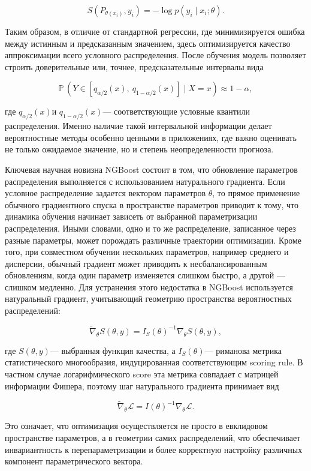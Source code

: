 \documentclass[
]{article}
\begin{document}
\[S(P_{\theta(x_{i})},y_{i}) = - \log p(y_{i} \mid x_{i};\theta).
\]

Таким образом, в отличие от стандартной регрессии, где минимизируется ошибка между истинным и предсказанным значением, здесь оптимизируется качество аппроксимации всего условного распределения. После обучения модель позволяет строить доверительные или, точнее, предсказательные интервалы вида

\[\mathbb{P}\text{ ⁣}\left( Y \in \left\lbrack q_{\alpha/2}(x),\text{ }q_{1 - \alpha/2}(x) \right\rbrack \mid X = x \right) \approx 1 - \alpha,
\]

где \(q_{\alpha/2}(x)\)и \(q_{1 - \alpha/2}(x)\)--- соответствующие условные квантили распределения. Именно наличие такой интервальной информации делает вероятностные методы особенно ценными в приложениях, где важно оценивать не только ожидаемое значение, но и степень неопределенности прогноза.

Ключевая научная новизна NGBoost состоит в том, что обновление параметров распределения выполняется с использованием натурального градиента. Если условное распределение задается вектором параметров \(\theta\), то прямое применение обычного градиентного спуска в пространстве параметров приводит к тому, что динамика обучения начинает зависеть от выбранной параметризации распределения. Иными словами, одно и то же распределение, записанное через разные параметры, может порождать различные траектории оптимизации. Кроме того, при совместном обучении нескольких параметров, например среднего и дисперсии, обычный градиент может приводить к несбалансированным обновлениям, когда один параметр изменяется слишком быстро, а другой --- слишком медленно. Для устранения этого недостатка в NGBoost используется натуральный градиент, учитывающий геометрию пространства вероятностных распределений:

\[{\widetilde{\nabla}}_{\theta}S(\theta,y) = I_{S}(\theta)^{- 1}\nabla_{\theta}S(\theta,y),\]

где \(S(\theta,y)\)--- выбранная функция качества, а \(I_{S}(\theta)\)--- риманова метрика статистического многообразия, индуцированная соответствующим scoring rule. В частном случае логарифмического score эта метрика совпадает с матрицей информации Фишера, поэтому шаг натурального градиента принимает вид

\[{\widetilde{\nabla}}_{\theta}\mathcal{L =}I(\theta)^{- 1}\nabla_{\theta}\mathcal{L}.\]

Это означает, что оптимизация осуществляется не просто в евклидовом пространстве параметров, а в геометрии самих распределений, что обеспечивает инвариантность к перепараметризации и более корректную настройку различных компонент параметрического вектора.
\end{document}
